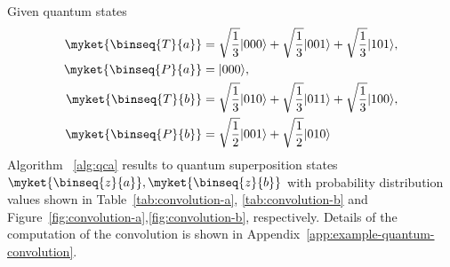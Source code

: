 \begin{example}
\label{exa:qca-a}
Given quantum states  
	\begin{align*}
		\myket{\binseq{T}{a}} &= \sqrt{\frac{1}{3}}\vert 000 \rangle + \sqrt{\frac{1}{3}}\vert 001 \rangle + \sqrt{\frac{1}{3}}\vert 101 \rangle,\\
		\myket{\binseq{P}{a}} &= \vert 000 \rangle,\\
		\myket{\binseq{T}{b}} &= \sqrt{\frac{1}{3}}\vert 010 \rangle + \sqrt{\frac{1}{3}}\vert 011 \rangle + \sqrt{\frac{1}{3}}\vert 100 \rangle,\\
		\myket{\binseq{P}{b}} &= \sqrt{\frac{1}{2}}\vert 001 \rangle + \sqrt{\frac{1}{2}}\vert 010 \rangle\
	\end{align*}
Algorithm ~\ref{alg:qca} results to quantum superposition states $\myket{\binseq{z}{a}}, \myket{\binseq{z}{b}}$ with probability distribution values shown in Table~\ref{tab:convolution-a}, \ref{tab:convolution-b} and Figure~\ref{fig:convolution-a},\ref{fig:convolution-b},  respectively. Details of the computation of the convolution is shown in Appendix~\ref{app:example-quantum-convolution}.
	

\end{example}
